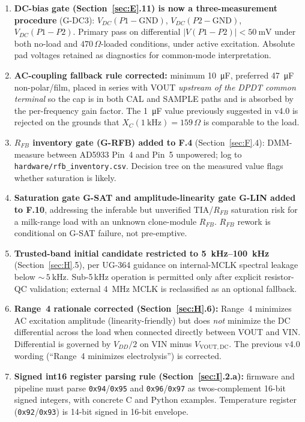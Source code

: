 \documentclass[11pt,a4paper]{article}
\newcommand{\Rohm}[1]{\ensuremath{#1\,\Omega}}
\begin{document}
\begin{enumerate}[leftmargin=1.5em]
\item \textbf{DC-bias gate (Section~\ref{sec:E}.11) is now a three-measurement procedure} (G-DC3): $V_{DC}(P1\!-\!\mathrm{GND})$, $V_{DC}(P2\!-\!\mathrm{GND})$, $V_{DC}(P1\!-\!P2)$. Primary pass on differential $|V(P1\!-\!P2)| < \SI{50}{\milli\volt}$ under both no-load and \Rohm{470}-loaded conditions, under active excitation. Absolute pad voltages retained as diagnostics for common-mode interpretation.
\item \textbf{AC-coupling fallback rule corrected:} minimum \SI{10}{\micro\farad}, preferred \SI{47}{\micro\farad} non-polar/film, placed in series with VOUT \emph{upstream of the DPDT common terminal} so the cap is in both CAL and SAMPLE paths and is absorbed by the per-frequency gain factor. The \SI{1}{\micro\farad} value previously suggested in v4.0 is rejected on the grounds that $X_C(\SI{1}{\kilo\hertz})\!=\!\Rohm{159}$ is comparable to the load.
\item \textbf{$R_{FB}$ inventory gate (G-RFB) added to F.4} (Section~\ref{sec:F}.4): DMM-measure between AD5933 Pin~4 and Pin~5 unpowered; log to \texttt{hardware/rfb\_inventory.csv}. Decision tree on the measured value flags whether saturation is likely.
\item \textbf{Saturation gate G-SAT and amplitude-linearity gate G-LIN added to F.10}, addressing the inferable but unverified TIA/$R_{FB}$ saturation risk for a milk-range load with an unknown clone-module $R_{FB}$. $R_{FB}$ rework is conditional on G-SAT failure, not pre-emptive.
\item \textbf{Trusted-band initial candidate restricted to \SIrange{5}{100}{\kilo\hertz}} (Section~\ref{sec:H}.5), per UG-364 \cite{ug364} guidance on internal-MCLK spectral leakage below ${\sim\,}\SI{5}{\kilo\hertz}$. Sub-5\,kHz operation is permitted only after explicit resistor-QC validation; external \SI{4}{\mega\hertz} MCLK is reclassified as an optional fallback.
\item \textbf{Range~4 rationale corrected (Section~\ref{sec:H}.6):} Range~4 minimizes AC excitation amplitude (linearity-friendly) but does \emph{not} minimize the DC differential across the load when connected directly between VOUT and VIN. Differential is governed by $V_{DD}/2$ on VIN minus $V_\mathrm{VOUT,DC}$. The previous v4.0 wording (``Range~4 minimizes electrolysis'') is corrected.
\item \textbf{Signed int16 register parsing rule (Section~\ref{sec:I}.2.a):} firmware and pipeline must parse \texttt{0x94}/\texttt{0x95} and \texttt{0x96}/\texttt{0x97} as twos-complement 16-bit signed integers, with concrete C and Python examples. Temperature register (\texttt{0x92}/\texttt{0x93}) is 14-bit signed in 16-bit envelope.

\end{enumerate}
\end{document}
